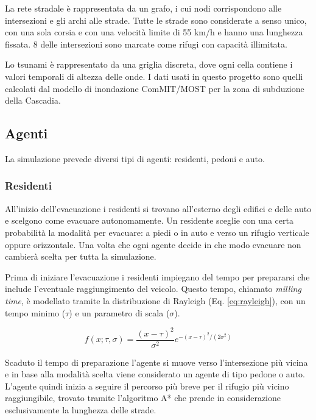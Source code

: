 La rete stradale è rappresentata da un grafo, i cui nodi corrispondono alle intersezioni e gli archi alle strade.
Tutte le strade sono considerate a senso unico, con una sola corsia e con una velocità limite di 55 km/h e hanno una lunghezza fissata.
8 delle intersezioni sono marcate come rifugi con capacità illimitata.

Lo tsunami è rappresentato da una griglia discreta, dove ogni cella contiene i valori temporali di altezza delle onde.
I dati usati in questo progetto sono quelli calcolati dal modello di inondazione ComMIT/MOST \parencite{titov1997implementation} per la zona di subduzione della Cascadia.

\subsection{Agenti}
La simulazione prevede diversi tipi di agenti: residenti, pedoni e auto.

\subsubsection{Residenti}
All'inizio dell'evacuazione i residenti si trovano all'esterno degli edifici e delle auto
e scelgono come evacuare autonomamente.
Un residente sceglie con una certa probabilità la modalità per evacuare: a piedi o in auto e verso un rifugio verticale oppure orizzontale.
Una volta che ogni agente decide in che modo evacuare non cambierà scelta per tutta la simulazione.

Prima di iniziare l'evacuazione i residenti impiegano del tempo per prepararsi
che include l'eventuale raggiungimento del veicolo.
%
Questo tempo, chiamato \textit{milling time}, è modellato tramite
la distribuzione di Rayleigh (Eq. \ref{eq:rayleigh}), con un tempo minimo ($\tau$) e un parametro di scala ($\sigma$).

\begin{equation}
  f(x; \tau, \sigma) = \frac{(x - \tau)^2}{\sigma^2}e^{-{(x - \tau)^2}/(2\sigma^2)}
  \label{eq:rayleigh}
\end{equation}

Scaduto il tempo di preparazione l'agente si muove verso l'intersezione più vicina e
in base alla modalità scelta viene considerato un agente di tipo pedone o auto.
L'agente quindi inizia a seguire il percorso più breve per il rifugio più vicino raggiungibile, trovato tramite l'algoritmo A* 
che prende in considerazione esclusivamente la lunghezza delle strade.

